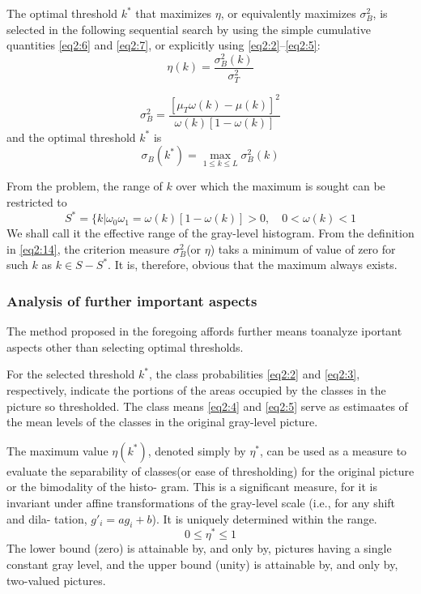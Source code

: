 The optimal threshold $k^*$ that maximizes $\eta$, or equivalently maximizes $\sigma_B^2$, is selected in the following sequential search by using the simple cumulative quantities \eqref{eq2:6} and \eqref{eq2:7}, or explicitly using \eqref{eq2:2}--\eqref{eq2:5}:
\begin{equation}
  \label{eq2:17}
  \eta(k)=\frac{\sigma_B^2(k)}{\sigma_T^2}
\end{equation}

\begin{equation}
  \label{eq2:18}
  \sigma_B^2=\frac{[\mu_T\omega(k)-\mu(k)]^2}{\omega(k)[1-\omega(k)]}
\end{equation}
and the optimal threshold $k^*$ is 
\begin{equation}
  \label{eq2:19}
  \sigma_B(k^*)=\max_{1\leqslant k\leqslant L}\sigma_B^2(k)
\end{equation}

From the problem, the range of $k$ over which the maximum is sought can be restricted to 
\begin{equation*}
  S^*=\{k|\omega_0\omega_1=\omega(k)[1-\omega(k)]>0,\quad
  0<\omega(k)<1
\end{equation*}
We shall call it the effective range of the gray-level histogram. From the definition in \eqref{eq2:14}, the criterion measure $\sigma_B^2$(or $\eta$) taks a minimum of value of zero for such $k$ as $k\in S-S^*$. It is, therefore, obvious that the maximum always exists.

\subsubsection*{Analysis of further important aspects}

The method proposed in the foregoing affords further means toanalyze iportant aspects other than selecting optimal thresholds.

For the selected threshold $k^*$, the class probabilities \eqref{eq2:2} and \eqref{eq2:3}, respectively, indicate the portions of the areas occupied by the classes in the picture so thresholded. The class means \eqref{eq2:4} and \eqref{eq2:5} serve as estimaates of the mean levels of the classes in the original gray-level picture. 

The maximum value $\eta(k^*)$, denoted simply by $\eta^*$, can be used as a measure to evaluate the separability of classes(or ease of thresholding) for the original picture or the bimodality of the histo-
gram. This is a significant measure, for it is invariant under affine
transformations of the gray-level scale (i.e., for any shift and dila-
tation, $g'_i=ag_i+b$). It is uniquely determined within the range.
\begin{equation*}
  0\leqslant\eta^*\leqslant 1
\end{equation*}
The lower bound (zero) is attainable by, and only by, pictures having a single constant gray level, and the upper bound (unity) is attainable by, and only by, two-valued pictures.

